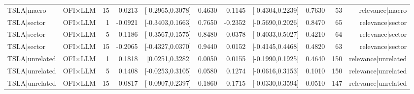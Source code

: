 \begin{table}[htbp]
\begin{tabular}{lrrrrrrrrrr}
TSLA|macro & OFI×LLM & 15 & 0.0213 & [-0.2965,0.3078] & 0.4630 & -0.1145 & [-0.4304,0.2239] & 0.7630 & 53 & relevance|macro \\
TSLA|sector & OFI×LLM & 1 & -0.0921 & [-0.3403,0.1663] & 0.7650 & -0.2352 & [-0.5690,0.2026] & 0.8470 & 65 & relevance|sector \\
TSLA|sector & OFI×LLM & 5 & -0.1186 & [-0.3567,0.1575] & 0.8480 & 0.0378 & [-0.4033,0.5027] & 0.4210 & 64 & relevance|sector \\
TSLA|sector & OFI×LLM & 15 & -0.2065 & [-0.4327,0.0370] & 0.9440 & 0.0152 & [-0.4145,0.4468] & 0.4820 & 63 & relevance|sector \\
TSLA|unrelated & OFI×LLM & 1 & 0.1818 & [0.0251,0.3282] & 0.0050 & 0.0155 & [-0.1990,0.1925] & 0.4640 & 150 & relevance|unrelated \\
TSLA|unrelated & OFI×LLM & 5 & 0.1408 & [-0.0253,0.3105] & 0.0580 & 0.1274 & [-0.0616,0.3153] & 0.1010 & 150 & relevance|unrelated \\
TSLA|unrelated & OFI×LLM & 15 & 0.0817 & [-0.0907,0.2397] & 0.1860 & 0.1715 & [-0.0330,0.3594] & 0.0510 & 147 & relevance|unrelated \\
\bottomrule
\end{tabular}
\end{table}
